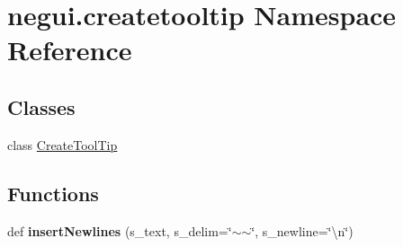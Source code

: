 \hypertarget{namespacenegui_1_1createtooltip}{}\section{negui.\+createtooltip Namespace Reference}
\label{namespacenegui_1_1createtooltip}
\subsection*{Classes}
\begin{DoxyCompactItemize}
\item 
class \hyperlink{classnegui_1_1createtooltip_1_1CreateToolTip}{Create\+Tool\+Tip}
\end{DoxyCompactItemize}
\subsection*{Functions}
\begin{DoxyCompactItemize}
\item 
def {\bfseries insert\+Newlines} (s\+\_\+text, s\+\_\+delim=\char`\"{}$\sim$$\sim$\char`\"{}, s\+\_\+newline=\char`\"{}\textbackslash{}n\char`\"{})\hypertarget{namespacenegui_1_1createtooltip_a4f1b93b1f06a346558c11b9e10c94046}{}\label{namespacenegui_1_1createtooltip_a4f1b93b1f06a346558c11b9e10c94046}

\end{DoxyCompactItemize}

